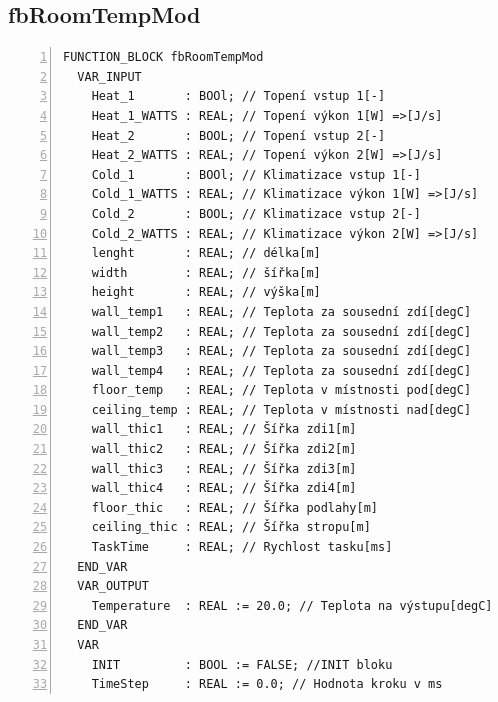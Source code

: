 \subsection{fbRoomTempMod}
\label{apend:fbRoomTempMod}
\begin{lstlisting}[language=ST, breaklines=true, numbers=left, numberstyle=\small, numbersep=10pt, frame=single, basicstyle=\ttfamily\small, caption={fbRoomTempMod}, label={lst:fbRoomTempMod}]
FUNCTION_BLOCK fbRoomTempMod
  VAR_INPUT
    Heat_1       : BOOl; // Topení vstup 1[-]
    Heat_1_WATTS : REAL; // Topení výkon 1[W] =>[J/s]
    Heat_2       : BOOL; // Topení vstup 2[-]
    Heat_2_WATTS : REAL; // Topení výkon 2[W] =>[J/s]
    Cold_1       : BOOl; // Klimatizace vstup 1[-]
    Cold_1_WATTS : REAL; // Klimatizace výkon 1[W] =>[J/s]
    Cold_2       : BOOL; // Klimatizace vstup 2[-]
    Cold_2_WATTS : REAL; // Klimatizace výkon 2[W] =>[J/s]
    lenght       : REAL; // délka[m]
    width        : REAL; // šířka[m]
    height       : REAL; // výška[m]
    wall_temp1   : REAL; // Teplota za sousední zdí[degC]
    wall_temp2   : REAL; // Teplota za sousední zdí[degC]
    wall_temp3   : REAL; // Teplota za sousední zdí[degC]
    wall_temp4   : REAL; // Teplota za sousední zdí[degC]
    floor_temp   : REAL; // Teplota v místnosti pod[degC]
    ceiling_temp : REAL; // Teplota v místnosti nad[degC]
    wall_thic1   : REAL; // Šířka zdi1[m]
    wall_thic2   : REAL; // Šířka zdi2[m]
    wall_thic3   : REAL; // Šířka zdi3[m]
    wall_thic4   : REAL; // Šířka zdi4[m]
    floor_thic   : REAL; // Šířka podlahy[m]
    ceiling_thic : REAL; // Šířka stropu[m]
    TaskTime     : REAL; // Rychlost tasku[ms]
  END_VAR
  VAR_OUTPUT
    Temperature  : REAL := 20.0; // Teplota na výstupu[degC]
  END_VAR
  VAR
    INIT         : BOOL := FALSE; //INIT bloku
    TimeStep     : REAL := 0.0; // Hodnota kroku v ms
\end{lstlisting}
\pagebreak
